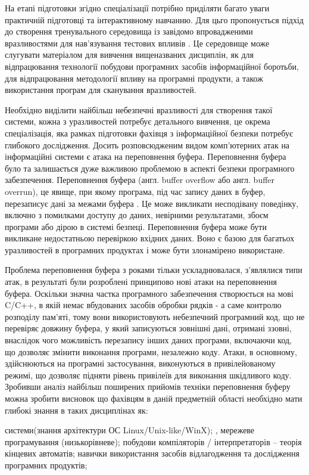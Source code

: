 На етапі підготовки згідно спеціалізації потрібно приділяти багато уваги практичній підготовці та інтерактивному навчанню. Для цьго пропонується підхід до створення тренувального середовища із завідомо впровадженими вразливостями для нав’язування тестових впливів 
. Це середовище може слугувати матеріалом для вивчення вищеназваних дисциплін, як для відпрацювання технології побудови програмних засобів інформаційної боротьби,  для відпрацювання методології впливу на програмні продукти, а також використання програм для сканування вразливостей.

Необхідно виділити найбільш небезпечні вразливості для створення такої системи, кожна з уразливостей потребує детального вивчення, це окрема спеціалізація,  яка рамках підготовки фахівця з інформаційної безпеки потребує глибокого дослідження.
Досить розповсюдженим видом комп'ютерних атак на інформаційні системи є атака на переповнення буфера.
Переповнення буфера було та залишається дуже важливою проблемою в аспекті безпеки програмного забезпечення. Переповнення буфера (англ. buffer overflow або англ. buffer overrun), це явище, при якому програма, під час запису даних в буфер, перезаписує дані за межами буфера 
. Це може викликати несподівану поведінку, включно з помилками доступу до даних, невірними результатами, збоєм програми або дірою в системі безпеці.
Переповнення буфера може бути викликане недостатньою перевіркою вхідних даних. Воно є базою для багатьох уразливостей в програмних продуктах і може бути злонамірено використане.

Проблема переповнення буфера з роками тільки ускладнювалася, з'являлися типи атак, в результаті були розроблені принципово нові атаки на переповнення буфера.
Оскільки значна частка програмного забезпечення створюється на мові C/C++, в якій немає вбудованих засобів обробки рядків - а саме контролю розподілу пам’яті, тому вони використовують небезпечний програмний код, що не перевіряє довжину буфера, у який записуються зовнішні дані, отримані ззовні, внаслідок чого можливість перезапису інших даних програми, включаючи код, що дозволяє змінити виконання програми, незалежно коду. Атаки, в основному, здійснюються на програмні застосування, виконуються в привілейованому режимі, що дозволяє підняти рівень привілеїв для виконання шкідливого коду.
Зробивши аналіз найбільш поширених прийомів техніки переповнення буферу можна зробити висновок що фахівцям в даній предметній області необхідно мати глибокі знання в таких дисциплінах як:
\begin{itemize}
 системи(знання архітектури ОС Linux/Unix-like/WinX);
, мережеве програмування (низькорівневе);
 побудови компіляторів / інтерпретаторів – теорія кінцевих автоматів;
 навички використання засобів відлагодження та дослідження програмних продуктів;
\end{itemize}

